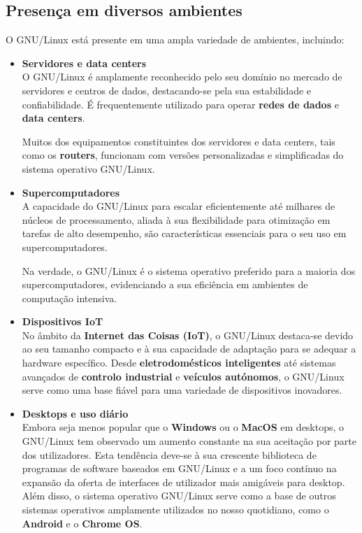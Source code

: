 \subsection{Presença em diversos ambientes}
O GNU/Linux está presente em uma ampla variedade de ambientes, incluindo: \cite{diverseUsage}
\begin{itemize}

    \item \textbf{Servidores e data centers}\\
    O GNU/Linux é amplamente reconhecido pelo seu domínio no mercado de servidores e centros de dados, destacando-se pela sua estabilidade e confiabilidade. É frequentemente utilizado para operar \textbf{redes de dados} e \textbf{data centers}.

    Muitos dos equipamentos constituintes dos servidores e data centers, tais como os \textbf{routers}, funcionam com versões personalizadas e simplificadas do sistema operativo GNU/Linux.

    \item \textbf{Supercomputadores}\\
    A capacidade do GNU/Linux para escalar eficientemente até milhares de núcleos de processamento, aliada à sua flexibilidade para otimização em tarefas de alto desempenho, são características essenciais para o seu uso em supercomputadores. 
    
    Na verdade, o GNU/Linux é o sistema operativo preferido para a maioria dos supercomputadores, evidenciando a sua eficiência em ambientes de computação intensiva.
    
    \item \textbf{Dispositivos IoT}\\
    No âmbito da \textbf{Internet das Coisas (IoT)}, o GNU/Linux destaca-se devido ao seu tamanho compacto e à sua capacidade de adaptação para se adequar a hardware específico. Desde \textbf{eletrodomésticos inteligentes} até sistemas avançados de \textbf{controlo industrial} e \textbf{veículos autónomos}, o GNU/Linux serve como uma base fiável para uma variedade de dispositivos inovadores.

    \item \textbf{Desktops e uso diário}\\
    Embora seja menos popular que o \textbf{Windows} ou o \textbf{MacOS} em desktops, o GNU/Linux tem observado um aumento constante na sua aceitação por parte dos utilizadores. Esta tendência deve-se à sua crescente biblioteca de programas de software baseados em GNU/Linux e a um foco contínuo na expansão da oferta de interfaces de utilizador mais amigáveis para desktop. Além disso, o sistema operativo GNU/Linux serve como a base de outros sistemas operativos amplamente utilizados no nosso quotidiano, como o \textbf{Android} e o \textbf{Chrome OS}.


\end{itemize}
